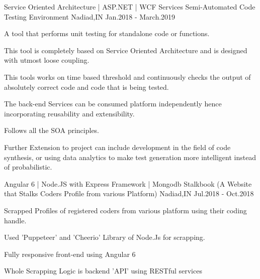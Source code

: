 


\begin{cventries}


\cventry
{Service Oriented Architecture | ASP.NET | WCF Services} %
{Semi-Automated Code Testing Environment} %
{Nadiad,IN} %
{Jan.2018 - March.2019} %
{ %
\begin{cvitems}
\item {A tool that performs unit testing for standalone code or functions.}
\item {This tool is completely based on Service Oriented Architecture and is designed with utmost loose coupling.}
\item {This tools works on time based threshold and continuously checks the output of absolutely correct code and code that is being tested.}
\item {The back-end Services can be consumed platform independently hence incorporating reusability and extensibility.}
\item {Follows all the SOA principles.}
\item {Further Extension to project can include development in the field of code synthesis, or using data analytics to make test generation more intelligent instead of probabilistic.}
\end{cvitems}
}


\cventry
{Angular 6 | Node.JS with Express Framework | Mongodb} %
{Stalkbook (A Website that Stalks Coders Profile from various Platform)} %
{Nadiad,IN} %
{Jul.2018 - Oct.2018} %
{ %
\begin{cvitems}
\item {Scrapped Profiles of registered coders from various platform using their coding handle.}
\item {Used 'Puppeteer' and 'Cheerio' Library of Node.Js for scrapping.}
\item {Fully responsive front-end using Angular 6}
\item {Whole Scrapping Logic is backend 'API' using RESTful services}
\end{cvitems}
}


\end{cventries}
